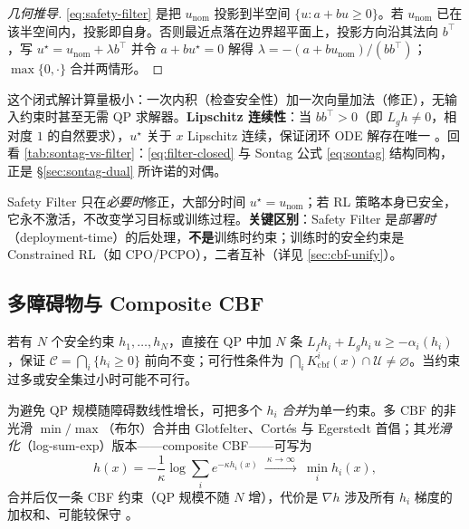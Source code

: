 \begin{proof}[几何推导]
\cref{eq:safety-filter} 是把 $u_{\mathrm{nom}}$ 投影到半空间 $\{u:a+bu\ge0\}$。若 $u_{\mathrm{nom}}$ 已在该半空间内，投影即自身。否则最近点落在边界超平面上，投影方向沿其法向 $b^\top$，写 $u^\star=u_{\mathrm{nom}}+\lambda b^\top$ 并令 $a+bu^\star=0$ 解得 $\lambda=-(a+bu_{\mathrm{nom}})/(bb^\top)$；$\max\{0,\cdot\}$ 合并两情形。
\end{proof}

这个闭式解计算量极小：一次内积（检查安全性）加一次向量加法（修正），无输入约束时甚至无需 QP 求解器。\textbf{Lipschitz 连续性}：当 $bb^\top>0$（即 $L_gh\neq0$，相对度 $1$ 的自然要求），$u^\star$ 关于 $x$ Lipschitz 连续，保证闭环 ODE 解存在唯一 \cite{morris2013lipschitz}。回看 \cref{tab:sontag-vs-filter}：\cref{eq:filter-closed} 与 Sontag 公式 \cref{eq:sontag} 结构同构，正是 §\ref{sec:sontag-dual} 所许诺的对偶。

\begin{pitfall}
Safety Filter 只在\emph{必要时}修正，大部分时间 $u^\star=u_{\mathrm{nom}}$；若 RL 策略本身已安全，它永不激活，不改变学习目标或训练过程。\textbf{关键区别}：Safety Filter 是\emph{部署时}（deployment-time）的后处理，\textbf{不是}训练时约束；训练时的安全约束是 Constrained RL（如 CPO/PCPO），二者互补（详见 \cref{sec:cbf-unify}）。
\end{pitfall}

\subsection{多障碍物与 Composite CBF}

若有 $N$ 个安全约束 $h_1,\dots,h_N$，直接在 QP 中加 $N$ 条 $L_fh_i+L_gh_i\,u\ge-\alpha_i(h_i)$，保证 $\mathcal C=\bigcap_i\{h_i\ge0\}$ 前向不变；可行性条件为 $\bigcap_iK_{\mathrm{cbf}}^i(x)\cap\mathcal U\neq\varnothing$。当约束过多或安全集过小时可能不可行。

为避免 QP 规模随障碍数线性增长，可把多个 $h_i$ \emph{合并}为单一约束。多 CBF 的非光滑 $\min/\max$（布尔）合并由 Glotfelter、Cort\'es 与 Egerstedt \cite{glotfelter2017nonsmooth} 首倡；其\emph{光滑化}（log-sum-exp）版本——composite CBF——可写为
\begin{equation}
h(x)=-\frac1\kappa\log\sum_i e^{-\kappa h_i(x)}\ \xrightarrow{\ \kappa\to\infty\ }\ \min_i h_i(x),
\label{eq:composite-cbf}
\end{equation}
合并后仅一条 CBF 约束（QP 规模不随 $N$ 增），代价是 $\nabla h$ 涉及所有 $h_i$ 梯度的加权和、可能较保守 \cite{molnar2024composing}。

